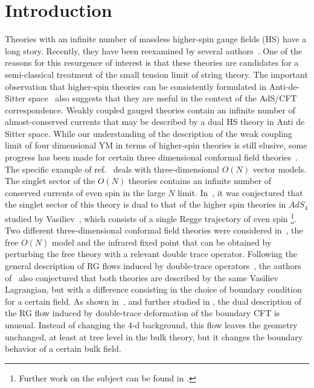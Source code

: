 \documentclass[a4paper,12pt]{article}
\begin{document}
\newpage
\section{Introduction}

Theories with an infinite number of massless higher-spin gauge fields
(HS) have a long story. Recently, they have been reexamined by several
authors~\cite{list}. One of the reasons for this resurgence of
interest is that these theories are candidates for a semi-classical
treatment of the small tension limit of string theory. The important
observation that higher-spin theories can be consistently formulated
in Anti-de-Sitter space~\cite{fv} also suggests that they are useful
in the context of the AdS/CFT correspondence. Weakly coupled gauged
theories contain an infinite number of almost-conserved currents that
may be described by a dual HS theory in Anti de Sitter space.  While
our understanding of the description of the weak coupling limit of
four dimensional YM in terms of higher-spin theories is still elusive,
some progress has been made for certain three dimensional conformal
field theories~\cite{kp}. The specific example of ref.~\cite{kp} deals
with three-dimensional $O(N)$ vector models. The singlet sector of the
$O(N)$ theories contains an infinite number of conserved currents of
even spin in the large $N$ limit. In~\cite{kp}, it was conjectured
that the singlet sector of this theory is dual to that of the higher
spin theories in $AdS_4$ studied by Vasiliev~\cite{v}, which consists
of a single Regge trajectory of even spin \footnote{Further work on
the subject can be found in \cite{tedeschi}.}.  Two different
three-dimensional conformal field theories were considered
in~\cite{kp}, the free $O(N)$ model and the infrared fixed point that
can be obtained by perturbing the free theory with a relevant double
trace operator.  Following the general description of RG flows induced
by double-trace operators~\cite{silverstein,wdouble,berkooz}, the
authors of~\cite{kp} also conjectured that both theories are described
by the same Vasiliev Lagrangian, but with a difference consisting in
the choice of boundary condition for a certain field.  As shown
in~\cite{wdouble}, and further studied in \cite{gubser,gk}, the dual
description of the RG flow induced by double-trace deformation of the
boundary CFT is unusual. Instead of changing the 4-d background, this
flow leaves the geometry unchanged, at least at tree level in the bulk
theory, but it changes the boundary behavior of a certain bulk field.
\end{document}
